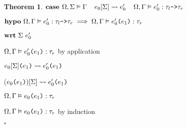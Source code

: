 \documentclass[acmsmall]{acmart}
\theoremstyle{definition}
\newtheorem{theorem}{Theorem}[section]
\begin{document}
\begin{theorem}
    \item \Z $\textbf{case }
      \Omega, \Sigma \vDash \Gamma
      \hspace{4mm}
      e_0[\Sigma] \rightsquigarrow e_0'
      \hspace{4mm}
      \Omega, \Gamma \vDash e_0' : \tau_l \texttt{->} \tau_r
    $
    \item \Z $\B{hypo}\ 
      \Omega, \Gamma \satisfies e_0' \hastype \tau_l \code{->} \tau_r
      \implies
      \Omega, \Gamma \satisfies \code{$e_0'$($e_1$)} \hastype \tau_r
    $
    \item \Z $ 
    \textbf{wrt}\ \Sigma\ e_0' 
    $
      \item \Z\Z $\Omega, \Gamma \vDash e_0'\texttt{(}e_1\texttt{)} : \tau_r$ by application 
      \item \Z\Z $e_0[\Sigma]\texttt{(}e_1\texttt{)} \rightsquigarrow e_0'\texttt{(}e_1\texttt{)}$
      \item \Z\Z ($e_0\texttt{(}e_1\texttt{)})[\Sigma] \rightsquigarrow e_0'\texttt{(}e_1\texttt{)}$
      \item \Z\Z $\Omega, \Gamma \vDash e_0\texttt{(}e_1\texttt{)} : \tau_r$ 

    \item \Z $\Omega, \Gamma \vDash e_0\texttt{(}e_1\texttt{)} : \tau_r$ by induction
  \item $\square$
\end{theorem}
\end{document}
